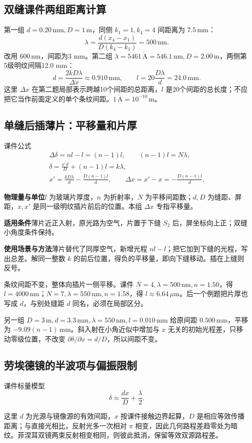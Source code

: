 \documentclass[UTF8,fontset=none,zihao=-4,a4paper]{ctexart}
\newcommand{\unit}[1]{\,\mathrm{#1}}
\newcommand{\explain}[3]{\par\noindent\textbf{物理量与单位}\quad #1\par
\noindent\textbf{适用条件}\quad #2\par
\noindent\textbf{使用场景与方法}\quad #3\par}
\begin{document}
\subsection{双缝课件两组距离计算}
第一组 $d=0.20\unit{mm},D=1\unit m$，同侧 $k_1=1,k_4=4$ 间距离为 $7.5\unit{mm}$：
\[
 \lambda=\frac{d(x_4-x_1)}{D(k_4-k_1)}=500\unit{nm}.
\]
改用 $600\unit{nm}$，间距为3 mm。第二组 $\lambda=5461\unit{\mathring A}=546.1\unit{nm},D=2.00\unit m$，两侧第5级明纹间隔12.0 mm：
\[
 d=\frac{2kD\lambda}{\Delta x}\approx0.910\unit{mm},\qquad
 l=20\frac{D\lambda}d=24.0\unit{mm}.
\]
这里 $\Delta x$ 在第二题局部表示跨越10个间距的总距离，$l$ 是20个间距的总长度；不应把它当作前面定义的单个条纹间距。$1\unit{\mathring A}=10^{-10}\unit m$。

\subsection{单缝后插薄片：平移量和片厚}
\begin{infobox}[breakable=false]{课件公式}
\begin{gather*}
 \Delta\delta=nl-l=(n-1)l,\qquad (n-1)l=N\lambda,\\
 \delta=\frac{x'd}{D}+(n-1)l=k\lambda,\\
 x'=\frac{kD\lambda}{d}-\frac{D(n-1)l}{d},\qquad
 \Delta x=x'-x=-\frac{D(n-1)l}{d}.
\end{gather*}
\end{infobox}
\explain{$l$ 为玻璃片厚度，$n$ 为折射率，$N$ 为平移间距数；$d,D$ 为缝距、屏距，$x,x'$ 是同一级明纹插片前后的位置。本组 $\Delta x$ 专指平移量。}{薄片近正入射，原光路为空气，片置于下缝 $S_2$ 后，屏坐标向上正；双缝小角度条件保持。}{薄片替代了同厚空气，新增光程 $nl-l$；把它加到下缝的光程，写出总差。解同一整数 $k$ 的前后位置，得负的平移量，即向下缝移动。插在上缝则反号。}
条纹间距不变，整体向插片一侧平移。课件 $N=4,\lambda=500\unit{nm},n=1.50$，得 $l=4000\unit{nm}$；$N=7,\lambda=550\unit{nm},n=1.58$，得 $l\approx6.64\,\mu\mathrm m$。后一个例题把片厚也写成 $d$，与别处缝距 $d$ 同名，必须在局部区分。

另一组 $D=3\unit m,d=3.3\unit{mm},\lambda=550\unit{nm},l=0.010\unit{mm}$ 给原间距 $0.500\unit{mm}$，平移为 $-9.09(n-1)\unit{mm}$。斜入射在小角近似中增加与 $x$ 无关的初始光程差，只移动零级位置，不改变 $\partial\delta/\partial x=d/D$，所以间距不变。

\subsection{劳埃德镜的半波项与偏振限制}
\begin{infobox}[breakable=false]{课件标量模型}
\[
 \delta\approx\frac{dx}{D}+\frac\lambda2.
\]
\end{infobox}
这里 $d$ 为光源与镜像源的有效间距，$x$ 按课件接触边界起算，$D$ 是相应等效传播距离；与直接光相比，反射光多一次相对 $\pi$ 相变，因此几何路程差趋零处为暗纹。菲涅耳双镜两束反射相变相同，则彼此抵消，保留等效双源路程差。
\end{document}
